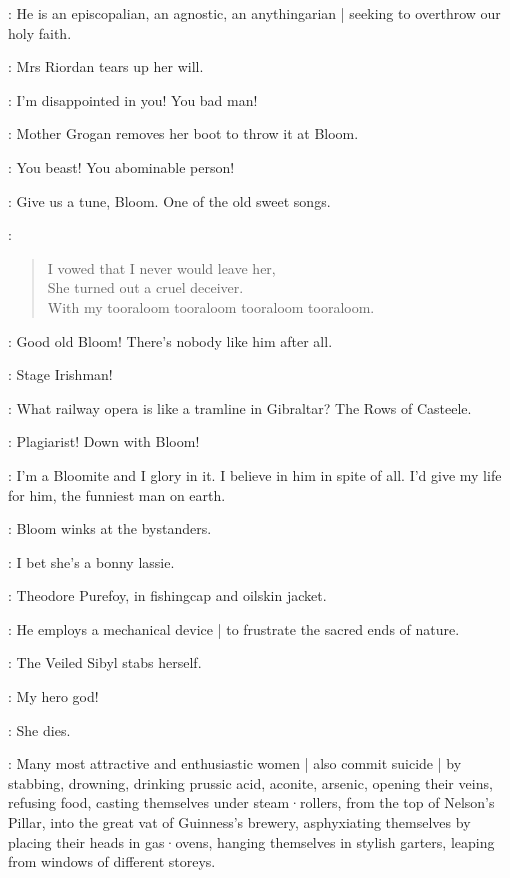 \FatherFarley[1]:
He is an episcopalian,
an agnostic,
an anythingarian |
seeking to overthrow our holy faith.

:
Mrs Riordan tears up her will.

\MrsRiordan:
I'm disappointed in you!
You bad man!

:
Mother Grogan removes her boot to throw it at Bloom.

\MotherGrogan:
You beast!
You abominable person!

\NoseyFlynn[2]:
Give us a tune,
Bloom.
One of the old sweet songs.

\Bloom:
\begin{verse}
    I vowed that I never would leave her,\\
    She turned out a cruel deceiver.\\
    With my tooraloom tooraloom tooraloom tooraloom.
\end{verse}

\HoppyHolohan[1]:
Good old Bloom!
There's nobody like him after all.

\PaddyLeonard[2]:
Stage Irishman!

\Bloom:
What railway opera is like a tramline in Gibraltar?
The Rows of Casteele.


\Lenehan[1]:
Plagiarist!
Down with Bloom!

\VeiledSibyl[2]:
I'm a Bloomite and I glory in it.
I believe in him in spite of all.
I'd give my life for him,
the funniest man on earth.

:
Bloom winks at the bystanders.

\Bloom:
I bet she's a bonny lassie.

:
Theodore Purefoy,
in fishingcap and oilskin jacket.

\TheodorePurefoy:
He employs a mechanical device |
to frustrate the sacred ends of nature.

:
The Veiled Sibyl stabs herself.

\VeiledSibyl:
My hero god!

:
She dies.

:
Many most attractive and enthusiastic women |
also commit suicide |
by stabbing,
drowning,
drinking prussic acid,
aconite,
arsenic,
opening their veins,
refusing food,
casting themselves under steam·rollers,
from the top of Nelson's Pillar,
into the great vat of Guinness's brewery,
asphyxiating themselves by placing their heads in gas·ovens,
hanging themselves in stylish garters,
leaping from windows of different storeys.

